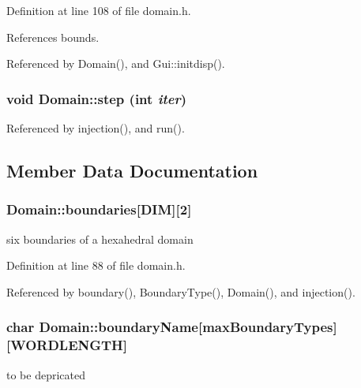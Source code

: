 Definition at line 108 of file domain.h.

References bounds.

Referenced by Domain(), and Gui::initdisp().\hypertarget{classDomain_9ca54d0631f30e5094f3843845821e5b}{
\subsubsection[{step}]{\setlength{\rightskip}{0pt plus 5cm}void Domain::step (int {\em iter})}}
\label{classDomain_9ca54d0631f30e5094f3843845821e5b}




Referenced by injection(), and run().

\subsection{Member Data Documentation}
\hypertarget{classDomain_160ecf16968a52e57d29a1679118bfc2}{
\subsubsection[{boundaries}]{ {\bf Domain::boundaries}\mbox{[}DIM\mbox{]}\mbox{[}2\mbox{]}}}
\label{classDomain_160ecf16968a52e57d29a1679118bfc2}


six boundaries of a hexahedral domain 



Definition at line 88 of file domain.h.

Referenced by boundary(), BoundaryType(), Domain(), and injection().\hypertarget{classDomain_140781c8fcb1a5176ad70097379d9021}{
\subsubsection[{boundaryName}]{\setlength{\rightskip}{0pt plus 5cm}char {\bf Domain::boundaryName}\mbox{[}maxBoundaryTypes\mbox{]}\mbox{[}WORDLENGTH\mbox{]}}}
\label{classDomain_140781c8fcb1a5176ad70097379d9021}


to be depricated 



